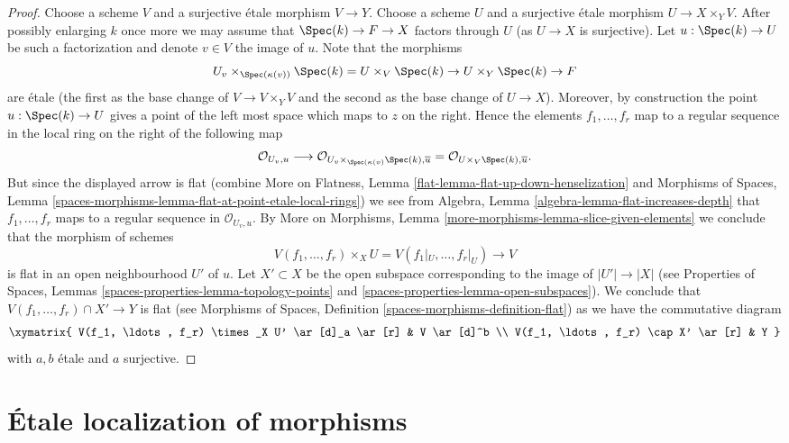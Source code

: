\begin{proof}
\medskip\noindent
Choose a scheme $V$ and a surjective \'etale morphism
$V \to Y$. Choose a scheme $U$ and a surjective \'etale morphism
$U \to X \times_Y V$. After possibly enlarging $k$ once more we may
assume that $\Spec(k) \to F \to X$ factors through $U$ (as
$U \to X$ is surjective). Let
$u : \Spec(k) \to U$ be such a factorization and denote $v \in V$
the image of $u$. Note that the morphisms
$$
U_v \times_{\Spec(\kappa(v))} \Spec(k) =
U \times_V \Spec(k) \to U \times_Y \Spec(k) \to F
$$
are \'etale (the first as the base change of $V \to V \times_Y V$ and
the second as the base change of $U \to X$). Moreover, by construction
the point $u : \Spec(k) \to U$ gives a point of the left most
space which maps to $z$ on the right. Hence the elements
$f_1, \ldots, f_r$ map to a regular sequence in the local ring
on the right of the following map
$$
\mathcal{O}_{U_v, u}
\longrightarrow
\mathcal{O}_{U_v \times_{\Spec(\kappa(v)} \Spec(k), \overline{u}}
=
\mathcal{O}_{U \times_V \Spec(k), \overline{u}}.
$$
But since the displayed arrow is flat (combine
More on Flatness, Lemma \ref{flat-lemma-flat-up-down-henselization}
and
Morphisms of Spaces,
Lemma \ref{spaces-morphisms-lemma-flat-at-point-etale-local-rings})
we see from
Algebra, Lemma \ref{algebra-lemma-flat-increases-depth}
that $f_1, \ldots, f_r$ maps to a regular sequence in
$\mathcal{O}_{U_v, u}$. By
More on Morphisms, Lemma \ref{more-morphisms-lemma-slice-given-elements}
we conclude that the morphism of schemes
$$
V(f_1, \ldots, f_r) \times_X U = V(f_1|_U, \ldots, f_r|_U) \to V
$$
is flat in an open neighbourhood $U'$ of $u$. Let $X' \subset X$
be the open subspace corresponding to the image of
$|U'| \to |X|$ (see
Properties of Spaces, Lemmas
\ref{spaces-properties-lemma-topology-points} and
\ref{spaces-properties-lemma-open-subspaces}).
We conclude that $V(f_1, \ldots, f_r) \cap X' \to Y$ is flat
(see
Morphisms of Spaces, Definition \ref{spaces-morphisms-definition-flat})
as
we have the commutative diagram
$$
\xymatrix{
V(f_1, \ldots, f_r) \times_X U' \ar[d]_a \ar[r] & V \ar[d]^b \\
V(f_1, \ldots, f_r) \cap X' \ar[r] & Y
}
$$
with $a, b$ \'etale and $a$ surjective.
\end{proof}









\section{\'Etale localization of morphisms}
\label{section-etale-localization}

